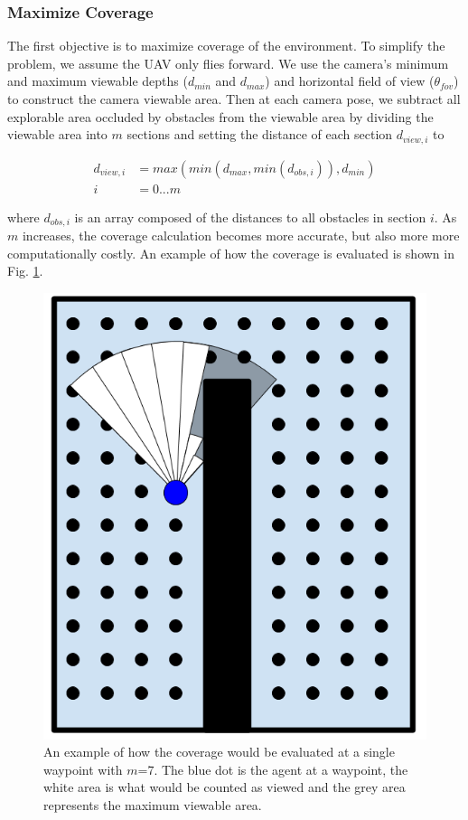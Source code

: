 \documentclass[letterpaper, 10 pt, conference]{ieeeconf}  %
\begin{document}
\subsubsection{Maximize Coverage}

The first objective is to maximize coverage of the environment.  To simplify the problem, we assume the UAV only flies forward. We use the camera's minimum and maximum viewable depths ($d_{min}$ and $d_{max}$) and horizontal field of view ($\theta_{fov}$) to construct the camera viewable area. Then at each camera pose, we subtract all explorable area occluded by obstacles from the viewable area by dividing the viewable area into $m$ sections and setting the distance of each section $d_{view,i}$ to

\begin{align}
  d_{view,i} &= max(min(d_{max}, min(d_{obs,i})),d_{min}) \\
  i &= 0...m \nonumber
\end{align}

where $d_{obs,i}$ is an array composed of the distances to all obstacles in section $i$. As $m$ increases, the coverage calculation becomes more accurate, but also more more computationally costly. An example of how the coverage is evaluated is shown in Fig. \ref{fig:coverage_sections}.

\begin{figure}
\centering
\includegraphics[width=0.5\linewidth]{figures/coverage_sections.png}
\caption{An example of how the coverage would be evaluated at a single waypoint with $m$=7. The blue dot is the agent at a waypoint, the white area is what would be counted as viewed and the grey area represents the maximum viewable area.}
\label{fig:coverage_sections}
\end{figure}
\end{document}
